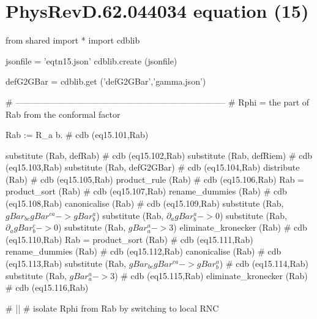 \documentclass[12pt]{cdblatex}
\begin{document}
\section*{PhysRevD.62.044034 equation (15)}

\begin{cadabra}
   from shared import *
   import cdblib

   jsonfile = 'eqtn15.json'
   cdblib.create (jsonfile)

   defG2GBar = cdblib.get ('defG2GBar','gamma.json')

   # --------------------------------------------------------------------------
   # Rphi = the part of Rab from the conformal factor

   Rab := R_{a b}.                                                   # cdb (eq15.101,Rab)

   substitute     (Rab, defRab)                                      # cdb (eq15.102,Rab)
   substitute     (Rab, defRiem)                                     # cdb (eq15.103,Rab)
   substitute     (Rab, defG2GBar)                                   # cdb (eq15.104,Rab)
   distribute     (Rab)                                              # cdb (eq15.105,Rab)
   product_rule   (Rab)                                              # cdb (eq15.106,Rab)
   Rab = product_sort (Rab)                                          # cdb (eq15.107,Rab)
   rename_dummies (Rab)                                              # cdb (eq15.108,Rab)
   canonicalise   (Rab)                                              # cdb (eq15.109,Rab)
   substitute     (Rab, $gBar_{b c} gBar^{c a} -> gBar^{a}_{b}$)
   substitute     (Rab, $\partial_{a}{gBar^{a}_{b}} -> 0$)
   substitute     (Rab, $\partial_{a}{gBar_{b}^{c}} -> 0$)
   substitute     (Rab, $gBar^{a}_{a} -> 3$)
   eliminate_kronecker (Rab)                                         # cdb (eq15.110,Rab)
   Rab = product_sort (Rab)                                          # cdb (eq15.111,Rab)
   rename_dummies (Rab)                                              # cdb (eq15.112,Rab)
   canonicalise   (Rab)                                              # cdb (eq15.113,Rab)
   substitute     (Rab, $gBar_{b c} gBar^{c a} -> gBar^{a}_{b}$)     # cdb (eq15.114,Rab)
   substitute     (Rab, $gBar^{a}_{a} -> 3$)                         # cdb (eq15.115,Rab)
   eliminate_kronecker (Rab)                                         # cdb (eq15.116,Rab)

   # |\clearpage|
   # isolate Rphi from Rab by switching to local RNC


\end{cadabra}
\end{document}
